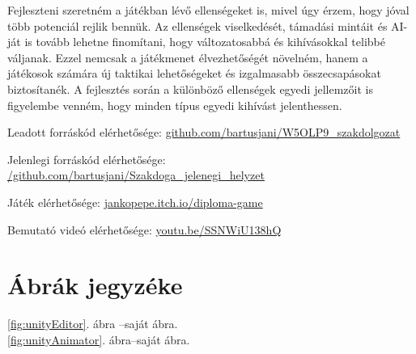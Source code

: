 \documentclass[
]{thesis-ekf}
\theoremstyle{definition}
\theoremstyle{remark}
\begin{document}
Fejleszteni szeretném a játékban lévő ellenségeket is, mivel úgy érzem, hogy jóval több potenciál rejlik bennük. Az ellenségek viselkedését, támadási mintáit és AI-ját is tovább lehetne finomítani, hogy változatosabbá és kihívásokkal telibbé váljanak. Ezzel nemcsak a játékmenet élvezhetőségét növelném, hanem a játékosok számára új taktikai lehetőségeket és izgalmasabb összecsapásokat biztosítanék. A fejlesztés során a különböző ellenségek egyedi jellemzőit is figyelembe venném, hogy minden típus egyedi kihívást jelenthessen.

Leadott forráskód elérhetősége:
\href{https://github.com/bartusjani/W5OLP9_szakdolgozat}{github.com/bartusjani/W5OLP9\_szakdolgozat}

Jelenlegi forráskód elérhetősége: \href{https://github.com/bartusjani/Szakdoga_jelenegi_helyzet}{/github.com/bartusjani/Szakdoga\_jelenegi\_helyzet}

Játék elérhetősége: \href{https://jankopepe.itch.io/diploma-game}{jankopepe.itch.io/diploma-game}

Bemutató videó elérhetősége: \href{https://youtu.be/SSNWiU138hQ}{youtu.be/SSNWiU138hQ}

\chapter*{Ábrák jegyzéke}
\begin{center}
	\ref{fig:unityEditor}. ábra --saját ábra.\\
	\ref{fig:unityAnimator}. ábra--saját ábra.
\end{center}
\end{document}
